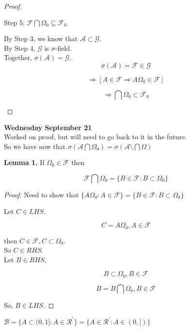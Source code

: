 \documentclass[11pt,fleqn]{book} %
\begin{document}
\begin{proof}
\begin{enumerate}[label = (\roman*)]
			Step 5: $\mathcal{F} \bigcap \Omega_0 \subseteq \mathcal{F}_0$

			By Step 3, we know that $\mathcal{A} \subset \mathcal{G}$.\\

			By Step 4, $\mathcal{G}$ is $\sigma$-field.\\

			Together, $\sigma(\mathcal{A}) = \mathcal{G}$.\\

			$$\sigma(\mathcal{A}) = \mathcal{F} \in \mathcal{G} $$

			$$\Rightarrow [A \in \mathcal{F} \Rightarrow A \Omega_0 \in \mathcal{F}] $$

			$$\Rightarrow \bigcap \Omega_0 \subset \mathcal{F}_0$$


	\end{enumerate}
\end{proof} 

\textbf{Wednesday September 21}\\

Worked on proof, but will need to go back to it in the future. \\


So we have now that $\sigma(\mathcal{A} \bigcap \Omega_0) = \sigma(\mathcal{A} \setminus \bigcap \Omega)$

\textbf{Lemma 1.} If $\Omega_0 \in \mathcal{F}$ then

	$$\mathcal{F} \bigcap \Omega_0 = \{B \in \mathcal{F}: B \subset \Omega_0 \} $$


\begin{proof}
	Need to show that $\{A \Omega_0: A \in \mathcal{F} \} = \{B \in \mathcal{F}: B \subset \Omega_0 \}$

	Let $C \in LHS$. 

	$$C = A \Omega_0, A \in \mathcal{F} $$

	then $C \in \mathcal{F}, C \subset \Omega_0$.\\

	So $C \in RHS$.\\

	Let $B \in RHS$, 

	$$B \subset \Omega_0, B \in \mathcal{F} $$

	$$B = B \bigcap \Omega_0,  B \in \mathcal{F}$$

	So, $B \in LHS$.
\end{proof}
	

	\begin{corollary}
		$\mathcal{B} = \{A \subset (0, 1]: A \in \mathcal{R}^\prime \} = \{A \in \mathcal{R}^\prime: A \in (0,]) \}$ 
	\end{corollary}
\end{document}
